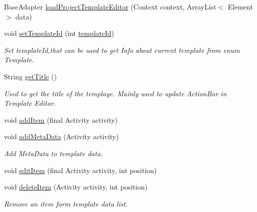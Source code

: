 \begin{DoxyCompactItemize}
\item 
Base\+Adapter \hyperlink{classorg_1_1buildmlearn_1_1toolkit_1_1templates_1_1LearnSpellingTemplate_a889d8d414440285b80ca93b6a243e05e}{load\+Project\+Template\+Editor} (Context context, Array\+List$<$ Element $>$ data)
\item 
void \hyperlink{classorg_1_1buildmlearn_1_1toolkit_1_1templates_1_1LearnSpellingTemplate_a14326fcdc8ba61fc65172a4ad06b7012}{set\+Template\+Id} (int \hyperlink{classorg_1_1buildmlearn_1_1toolkit_1_1templates_1_1LearnSpellingTemplate_a9a0737d2b579527b9d375518b9097014}{template\+Id})
\begin{DoxyCompactList}\small\item\em Set template\+Id,that can be used to get Info about current template from enum Template. \end{DoxyCompactList}\item 
String \hyperlink{classorg_1_1buildmlearn_1_1toolkit_1_1templates_1_1LearnSpellingTemplate_a06f51659532ed7300478ad233aa3e8b7}{get\+Title} ()
\begin{DoxyCompactList}\small\item\em Used to get the title of the templaye. Mainly used to update Action\+Bar in Template Editor. \end{DoxyCompactList}\item 
void \hyperlink{classorg_1_1buildmlearn_1_1toolkit_1_1templates_1_1LearnSpellingTemplate_a79df95c6c1990205f55cbc75a0b9a163}{add\+Item} (final Activity activity)
\item 
void \hyperlink{classorg_1_1buildmlearn_1_1toolkit_1_1templates_1_1LearnSpellingTemplate_a07b69a6061b09e649799cf69c2505beb}{add\+Meta\+Data} (Activity activity)
\begin{DoxyCompactList}\small\item\em Add Meta\+Data to template data. \end{DoxyCompactList}\item 
void \hyperlink{classorg_1_1buildmlearn_1_1toolkit_1_1templates_1_1LearnSpellingTemplate_ac1a2b3a4507302be292deb019ab563f4}{edit\+Item} (final Activity activity, int position)
\item 
void \hyperlink{classorg_1_1buildmlearn_1_1toolkit_1_1templates_1_1LearnSpellingTemplate_a488e201556351852b46fa4757d570a88}{delete\+Item} (Activity activity, int position)
\begin{DoxyCompactList}\small\item\em Remove an item form template data list. \end{DoxyCompactList}\item 

\end{DoxyCompactItemize}
